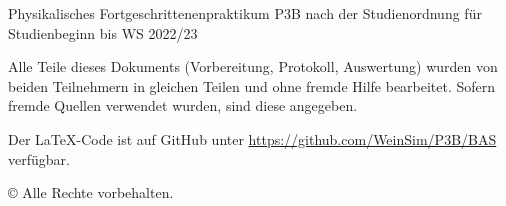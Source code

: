 \documentclass{article}
\title{\versuchsname}
\author{Simon Weinzierl, Yannic Werner}
\newcommand{\githuburl}{
    \url{https://github.com/WeinSim/P3B/BAS}
}
\begin{document}
\maketitle

\begin{center}
    Physikalisches Fortgeschrittenenpraktikum P3B
    nach der Studienordnung für Studienbeginn bis WS 2022/23
\end{center}

\vspace*{6cm}

\begin{center}
    \footnotesize
    Alle Teile dieses Dokuments (Vorbereitung, Protokoll, Auswertung) wurden
    von beiden Teilnehmern in gleichen Teilen und ohne fremde Hilfe bearbeitet.
    Sofern fremde Quellen verwendet wurden, sind diese angegeben.

    Der \LaTeX-Code ist auf GitHub unter \githuburl verfügbar.
    
    © Alle Rechte vorbehalten.
\end{center}


\newpage

\tableofcontents

\newpage



\end{document}
